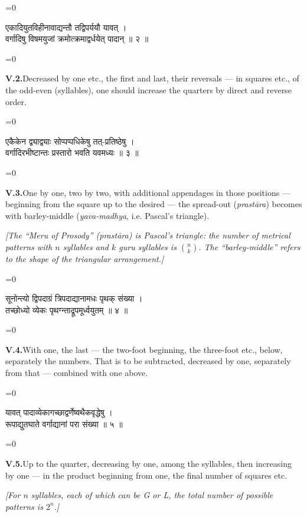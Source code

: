 \documentclass[11pt,a4paper]{article}
\newcommand{\dev}[1]{{\devanagarifont\color{sktcolor}#1}}
\newcommand{\iast}[1]{\textit{#1}}
\newenvironment{paracol}[1]{\begingroup}{\endgroup}
\newcommand{\switchcolumn}[1][]{%
  \ifnum#1=0\relax\else\par\nobreak\vspace{0.5em}\par\nobreak\fi%
}
\begin{document}
\vspace{0.3cm}

\begin{paracol}{2}
\switchcolumn[0]
\dev{%
एकादियुतविहीनावाद्यन्तौ तद्विपर्ययौ यावत् ।\\
वर्गादिषु विषमयुजां क्रमोत्क्रमाद्वर्धयेत् पादान् ॥ २ ॥
}

\switchcolumn[1]
\textbf{V.2.}\quad Decreased by one etc., the first and last,
their reversals — in squares etc., of the odd-even (syllables),
one should increase the quarters by direct and reverse order.
\end{paracol}

\vspace{0.3cm}

\begin{paracol}{2}
\switchcolumn[0]
\dev{%
एकैकेन द्व्याद्व्याः सोप्पप्पधिकेषु तत्-प्रतिष्ठेषु ।\\
वर्गादिरभीष्टान्तः प्रस्तारो भवति यवमध्यः ॥ ३ ॥
}

\switchcolumn[1]
\textbf{V.3.}\quad One by one, two by two, with additional
appendages in those positions — beginning from the square up to
the desired — the spread-out (\iast{prastāra}) becomes with
barley-middle (\iast{yava-madhya}, i.e. Pascal's triangle).

\medskip
\textit{[The ``Meru of Prosody'' (\iast{prastāra}) is Pascal's triangle:
the number of metrical patterns with $n$ syllables and $k$ guru
syllables is $\binom{n}{k}$. The ``barley-middle'' refers to the
shape of the triangular arrangement.]}
\end{paracol}

\vspace{0.3cm}

\begin{paracol}{2}
\switchcolumn[0]
\dev{%
सूनोन्त्यो द्विपदाग्रं त्रिपदाद्यानामधः पृथक् संख्या ।\\
तच्छोध्यो व्येकः पृथग्न्ताद्रूपमूर्ध्वयुतम् ॥ ४ ॥
}

\switchcolumn[1]
\textbf{V.4.}\quad With one, the last — the two-foot beginning,
the three-foot etc., below, separately the numbers. That is to be
subtracted, decreased by one, separately from that — combined
with one above.
\end{paracol}

\vspace{0.3cm}

\begin{paracol}{2}
\switchcolumn[0]
\dev{%
यावत् पादाव्येकागच्छाद्वर्णेष्वथैकवृद्धेषु ।\\
रूपाद्युतघाते वर्गाद्यानां परा संख्या ॥ ५ ॥
}

\switchcolumn[1]
\textbf{V.5.}\quad Up to the quarter, decreasing by one, among
the syllables, then increasing by one — in the product beginning
from one, the final number of squares etc.

\medskip
\textit{[For $n$ syllables, each of which can be G or L, the total
number of possible patterns is $2^n$.]}
\end{paracol}
\end{document}
